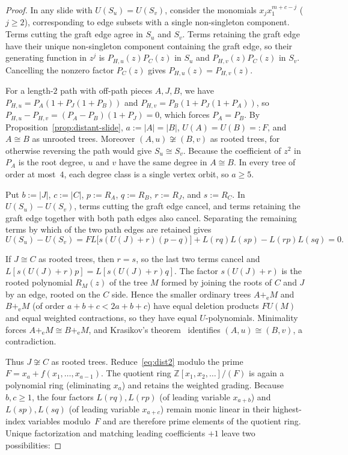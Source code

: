 \documentclass[10pt]{article}
\begin{document}
\begin{proof}
In any slide with $U(S_u)=U(S_v)$, consider the monomials $x_j x_1^{m+c-j}$ ($j\ge 2$), corresponding to edge subsets with a single non-singleton component. Terms cutting the graft edge agree in $S_u$ and $S_v$. Terms retaining the graft edge have their unique non-singleton component containing the graft edge, so their generating function in $z^j$ is $P_{H,u}(z)P_C(z)$ in $S_u$ and $P_{H,v}(z)P_C(z)$ in $S_v$. Cancelling the nonzero factor $P_C(z)$ gives $P_{H,u}(z)=P_{H,v}(z)$.

For a length-$2$ path with off-path pieces $A,J,B$, we have $P_{H,u} = P_A(1+P_J(1+P_B))$ and $P_{H,v} = P_B(1+P_J(1+P_A))$, so $P_{H,u}-P_{H,v} = (P_A-P_B)(1+P_J) = 0$, which forces $P_A=P_B$. By Proposition~\ref{prop:distant-slide}, $a := |A|=|B|$, $U(A)=U(B)=:F$, and $A\cong B$ as unrooted trees. Moreover $(A,u)\not\cong (B,v)$ as rooted trees, for otherwise reversing the path would give $S_u\cong S_v$. Because the coefficient of $z^2$ in $P_A$ is the root degree, $u$ and $v$ have the same degree in $A\cong B$. In every tree of order at most~$4$, each degree class is a single vertex orbit, so $a\ge 5$.

Put $b := |J|$, $c := |C|$, $p := R_A$, $q := R_B$, $r := R_J$, and $s := R_C$. In $U(S_u)-U(S_v)$, terms cutting the graft edge cancel, and terms retaining the graft edge together with both path edges also cancel. Separating the remaining terms by which of the two path edges are retained gives
\begin{equation}\label{eq:dist2}
U(S_u) - U(S_v) = F L\bigl[s(U(J)+r)(p-q)\bigr] + L(rq)L(sp) - L(rp)L(sq) = 0.
\end{equation}

If $J\cong C$ as rooted trees, then $r=s$, so the last two terms cancel and $L[s(U(J)+r)p] = L[s(U(J)+r)q]$. The factor $s(U(J)+r)$ is the rooted polynomial $R_M(z)$ of the tree $M$ formed by joining the roots of $C$ and $J$ by an edge, rooted on the $C$ side. Hence the smaller ordinary trees $A+_{\mathrm{e}} M$ and $B+_{\mathrm{e}} M$ (of order $a+b+c < 2a+b+c$) have equal deletion products $F U(M)$ and equal weighted contractions, so they have equal $U$-polynomials. Minimality forces $A+_{\mathrm{e}} M\cong B+_{\mathrm{e}} M$, and Krasikov's theorem~\cite{krasikov} identifies $(A,u)\cong (B,v)$, a contradiction.

Thus $J\not\cong C$ as rooted trees. Reduce~\eqref{eq:dist2} modulo the prime $F = x_a + f(x_1,\ldots,x_{a-1})$. The quotient ring $\mathbb{Z}[x_1,x_2,\ldots]/(F)$ is again a polynomial ring (eliminating $x_a$) and retains the weighted grading. Because $b,c\ge 1$, the four factors $L(rq),L(rp)$ (of leading variable $x_{a+b}$) and $L(sp),L(sq)$ (of leading variable $x_{a+c}$) remain monic linear in their highest-index variables modulo~$F$ and are therefore prime elements of the quotient ring. Unique factorization and matching leading coefficients $+1$ leave two possibilities:


\end{proof}
\end{document}
